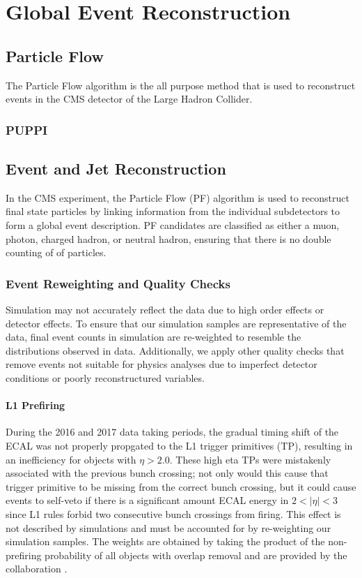 \chapter{Global Event Reconstruction}\label{chap:emul}
\section{Particle Flow}
The Particle Flow algorithm is the all purpose method that is used to reconstruct events in the CMS detector of the Large Hadron Collider.
\subsection{PUPPI}
	
\section{Event and Jet Reconstruction}\label{eventsel}
In the CMS experiment, the Particle Flow (PF) algorithm \cite{particleflow} is used to reconstruct final state particles by linking information from the individual subdetectors to form a global event description. PF candidates are classified as either a muon, photon, charged hadron, or neutral hadron, ensuring that there is no double counting of of particles.
\subsection{Event Reweighting and Quality Checks}
Simulation may not accurately reflect the data due to high order effects or detector effects. To ensure that our simulation samples are representative of the data, final event counts in simulation are re-weighted to resemble the distributions observed in data. Additionally, we apply other quality checks that remove events not suitable for physics analyses due to imperfect detector conditions or poorly reconstructured variables.
\subsubsection{L1 Prefiring}\label{prefiring}
During the 2016 and 2017 data taking periods, the gradual timing shift of the ECAL was not properly propgated to the L1 trigger primitives (TP), resulting in an inefficiency for objects with $\eta > 2.0$. These high eta TPs were mistakenly associated with the previous bunch crossing; not only would this cause that trigger primitive to be missing from the correct bunch crossing, but it could cause events to self-veto if there is a significant amount ECAL energy in $2<|\eta|<3$ since L1 rules forbid two consecutive bunch crossings from firing. This effect is not described by simulations and must be accounted for by re-weighting our simulation samples. The weights are obtained by taking the product of the non-prefiring probability of all objects with overlap removal and are provided by the collaboration \cite{l1prefiring}.
